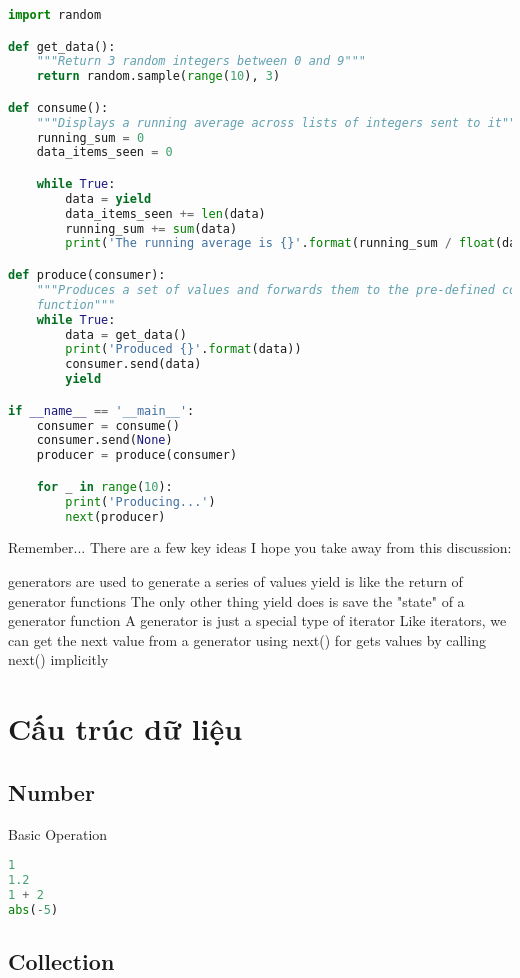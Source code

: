 \begin{lstlisting}[language=Python]
import random

def get_data():
    """Return 3 random integers between 0 and 9"""
    return random.sample(range(10), 3)

def consume():
    """Displays a running average across lists of integers sent to it"""
    running_sum = 0
    data_items_seen = 0

    while True:
        data = yield
        data_items_seen += len(data)
        running_sum += sum(data)
        print('The running average is {}'.format(running_sum / float(data_items_seen)))

def produce(consumer):
    """Produces a set of values and forwards them to the pre-defined consumer
    function"""
    while True:
        data = get_data()
        print('Produced {}'.format(data))
        consumer.send(data)
        yield

if __name__ == '__main__':
    consumer = consume()
    consumer.send(None)
    producer = produce(consumer)

    for _ in range(10):
        print('Producing...')
        next(producer)
\end{lstlisting}

Remember...
There are a few key ideas I hope you take away from this discussion:

generators are used to generate a series of values
yield is like the return of generator functions
The only other thing yield does is save the "state" of a generator function
A generator is just a special type of iterator
Like iterators, we can get the next value from a generator using next()
for gets values by calling next() implicitly

\section{Cấu trúc dữ liệu}

\subsection{Number}

Basic Operation

\begin{lstlisting}[language=Python]
1
1.2
1 + 2
abs(-5)
\end{lstlisting}

\subsection{Collection}

